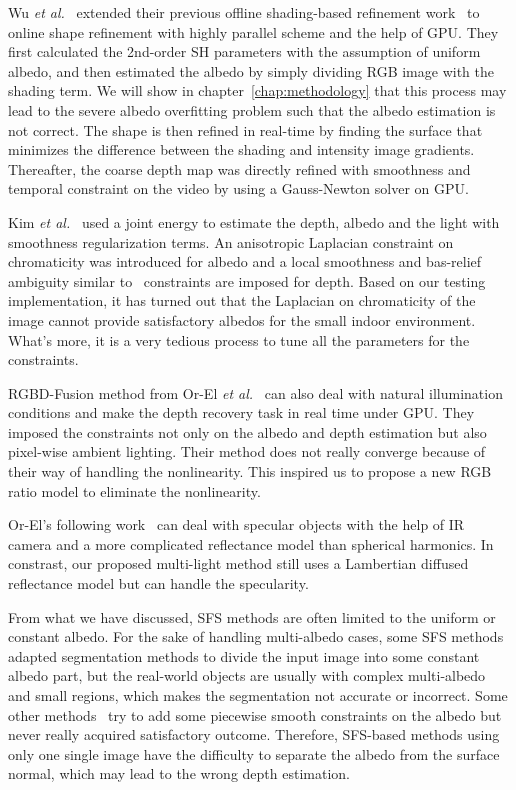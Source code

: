 Wu \emph{et al.}~\cite{wu2014real} extended their previous offline shading-based refinement work~\cite{wu2011shading} to online shape refinement with highly parallel scheme and the help of GPU. 
They first calculated the 2nd-order SH parameters with the assumption of uniform albedo, and then estimated the albedo by simply dividing RGB image with the shading term.
We will show in chapter~\ref{chap:methodology} that this process may lead to the severe albedo overfitting problem such that the albedo estimation is not correct.
The shape is then refined in real-time by finding the surface that minimizes the difference between the shading and intensity image gradients.
Thereafter, the coarse depth map was directly refined with smoothness and temporal constraint on the video by using a Gauss-Newton solver on GPU.

Kim \emph{et al.}~\cite{kim2015joint} used a joint energy to estimate the depth, albedo and the light with smoothness regularization terms.
An anisotropic Laplacian constraint on chromaticity was introduced for albedo and a local smoothness and bas-relief ambiguity similar to~\cite{barron2013intrinsic} constraints are imposed for depth.
Based on our testing implementation, it has turned out that the Laplacian on chromaticity of the image cannot provide satisfactory albedos for the small indoor environment.
What's more, it is a very tedious process to tune all the parameters for the constraints.

RGBD-Fusion method from Or-El \emph{et al.}~\cite{or2015rgbd} can also deal with natural illumination conditions and make the depth recovery task in real time under GPU. 
They imposed the constraints not only on the albedo and depth estimation but also pixel-wise ambient lighting.
Their method does not really converge because of their way of handling the nonlinearity.
This inspired us to propose a new RGB ratio model to eliminate the nonlinearity. 


Or-El's following work~\cite{or2016real} can deal with specular objects with the help of IR camera and a more complicated reflectance model than spherical harmonics. 
In constrast, our proposed multi-light method still uses a Lambertian diffused reflectance model but can handle the specularity.

From what we have discussed, SFS methods are often limited to the uniform or constant albedo. 
For the sake of handling multi-albedo cases, some SFS methods~\cite{han2013high, yu2013shading} adapted segmentation methods to divide the input image into some constant albedo part, but the real-world objects are usually with complex multi-albedo and small regions, which makes the segmentation not accurate or incorrect.  
Some other methods~\cite{wu2014real,kim2015joint,or2015rgbd,or2016real} try to add some piecewise smooth constraints on the albedo but never really acquired satisfactory outcome.
Therefore, SFS-based methods using only one single image have the difficulty to separate the albedo from the surface normal, which may lead to the wrong depth estimation.

